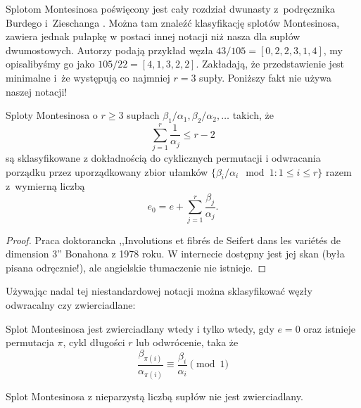 Splotom Montesinosa poświęcony jest cały rozdział dwunasty z~podręcznika Burdego i~Zieschanga \cite{burde85}.
Można tam znaleźć klasyfikację splotów Montesinosa, zawiera jednak pułapkę w postaci innej notacji niż nasza dla supłów dwumostowych.
Autorzy podają przykład węzła $43/105 = [0, 2, 2, 3, 1, 4]$, my opisalibyśmy go jako $105/22 = [4, 1, 3, 2, 2]$.
Zakładają, że przedstawienie jest minimalne i~że występują co najmniej $r = 3$ supły.
Poniższy fakt nie używa naszej notacji!

\begin{proposition}
    Sploty Montesinosa o $r \ge 3$ supłach $\beta_1/\alpha_1, \beta_2/\alpha_2, \ldots$ takich, że
    \begin{equation}
        \sum_{j=1}^r \frac{1}{\alpha_j} \le r - 2
    \end{equation}
    są sklasyfikowane z dokładnością do cyklicznych permutacji i odwracania porządku przez uporządkowany zbior ułamków $\{\beta_i/\alpha_i \mod 1 : 1 \le i \le r\}$ razem z~wymierną liczbą
    \begin{equation}
        e_0 = e + \sum_{j=1}^r \frac{\beta_j}{\alpha_j}.
    \end{equation}
\end{proposition}

\begin{proof}
    Praca doktorancka ,,Involutions et fibrés de Seifert dans les variétés de dimension $3$'' Bonahona z 1978 roku.
    W internecie dostępny jest jej skan (była pisana odręcznie!), ale angielskie tłumaczenie nie istnieje.
\end{proof}

Używając nadal tej niestandardowej notacji można sklasyfikować węzły odwracalny czy zwierciadlane:

\begin{proposition}
    Splot Montesinosa jest zwierciadlany wtedy i tylko wtedy, gdy $e = 0$ oraz istnieje permutacja $\pi$, cykl długości $r$ lub odwrócenie, taka że
    \begin{equation}
        \frac{\beta_{\pi(i)}}{\alpha_{\pi(i)}} \equiv \frac{\beta_i}{\alpha_i} \pmod 1
    \end{equation}
\end{proposition}

\begin{corollary}
    Splot Montesinosa z nieparzystą liczbą supłów nie jest zwierciadlany.
\end{corollary}

